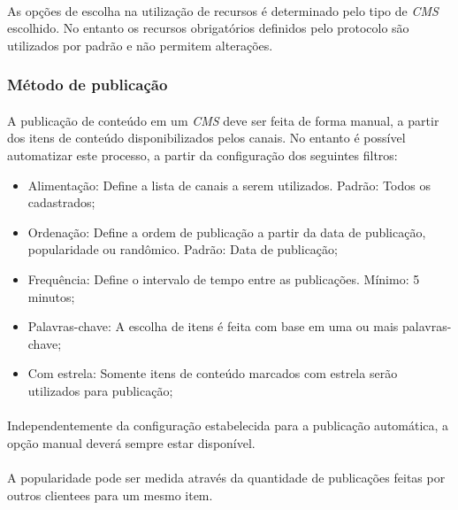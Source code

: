 \documentclass[a4paper,12pt]{article}
\def\cms{\emph{CMS}}
\begin{document}
\paragraph{}
As opções de escolha na utilização de recursos é determinado pelo tipo de \cms{} escolhido. No entanto os recursos obrigatórios definidos pelo protocolo são utilizados por padrão e não permitem alterações.

\subsubsection{Método de publicação}

\paragraph{}
A publicação de conteúdo em um \cms{} deve ser feita de forma manual, a partir dos itens de conteúdo disponibilizados pelos canais. No entanto é possível automatizar este processo, a partir da configuração dos seguintes filtros:

\begin{itemize}
\item Alimentação: Define a lista de canais a serem utilizados. Padrão: Todos os cadastrados;
\item Ordenação: Define a ordem de publicação a partir da data de publicação, popularidade ou randômico. Padrão: Data de publicação;
\item Frequência: Define o intervalo de tempo entre as publicações. Mínimo: 5 minutos;
\item Palavras-chave: A escolha de itens é feita com base em uma ou mais palavras-chave;
\item Com estrela: Somente itens de conteúdo marcados com estrela serão utilizados para publicação;
\end{itemize}

\paragraph{}
Independentemente da configuração estabelecida para a publicação automática, a opção manual deverá sempre estar disponível.

\paragraph{}
A popularidade pode ser medida através da quantidade de publicações feitas por outros clientees para um mesmo item.
\end{document}
